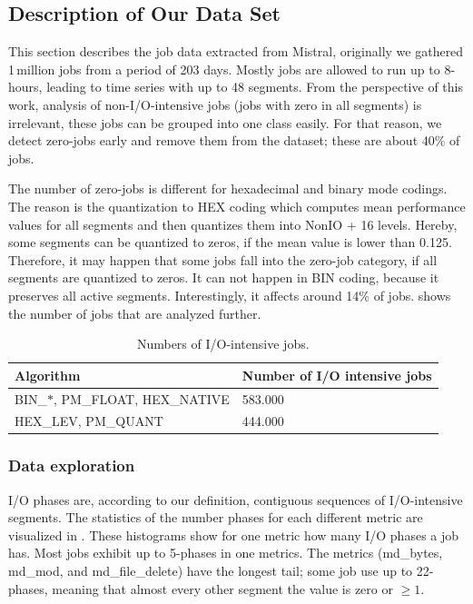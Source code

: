 \documentclass{jhps}
\begin{document}
\subsection{Description of Our Data Set}
This section describes the job data extracted from Mistral, originally we gathered 1\,million jobs from a period of 203 days.
Mostly jobs are allowed to run up to 8-hours, leading to time series with up to 48 segments.
From the perspective of this work, analysis of non-I/O-intensive jobs (jobs with zero in all segments) is irrelevant, these jobs can be grouped into one class easily.
For that reason, we detect zero-jobs early and remove them from the dataset; these are about 40\% of jobs.

The number of zero-jobs is different for hexadecimal and binary mode codings.
The reason is the quantization to HEX coding which computes mean performance values for all segments and then quantizes them into NonIO + 16 levels.
Hereby, some segments can be quantized to zeros, if the mean value is lower than 0.125.
Therefore, it may happen that some jobs fall into the zero-job category, if all segments are quantized to zeros.
It can not happen in BIN coding, because it preserves all active segments.
Interestingly, it affects around 14$\%$ of jobs.
 shows the number of jobs that are analyzed further.

\begin{table}
  \centering
  \begin{tabular}{ll}
    Algorithm & Number of I/O intensive jobs \\
    \midrule
    BIN\_$\ast$, PM\_FLOAT, HEX\_NATIVE &  583.000 \\
    HEX\_LEV, PM\_QUANT &  444.000 \\
  \end{tabular}
  \caption{Numbers of I/O-intensive jobs.}
  \label{tab:n_intensive_jobs}
\end{table}


\subsubsection{Data exploration}
I/O phases are, according to our definition, contiguous sequences of I/O-intensive segments.
The statistics of the number phases for each different metric are visualized in .
These histograms show for one metric how many I/O phases a job has.
Most jobs exhibit up to 5-phases in one metrics.
The metrics (md\_bytes, md\_mod, and md\_file\_delete) have the longest tail; some job use up to 22-phases, meaning that almost every other segment the value is zero or $\geq 1$.
\end{document}
